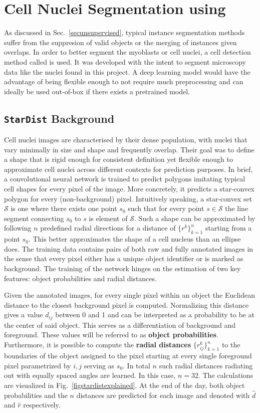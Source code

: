 \section{Cell Nuclei Segmentation using \stardist}\label{secstardist}
As discussed in Sec.~\ref{secunsupervised}, typical instance segmentation methods suffer from the suppresion of valid objects or the merging of instances given overlaps. In order to better segment the myoblasts or cell nuclei, a cell detection method called \stardist \cite{schmidt2018, weigert2020} is used. It was developed with the intent to segment microscopy data like the nuclei found in this project. A deep learning model would have the advantage of being flexible enough to not require much preprocessing and can ideally be used out-of-box if there exists a pretrained model.
\subsection{\texttt{StarDist} Background}
Cell nuclei images are characterised by their dense population, with nuclei that vary minimally in size and shape and frequently overlap. Their goal was to define a shape that is rigid enough for consistent definition yet flexible enough to approximate cell nuclei across different contexts for prediction purposes. In brief, a convolutional neural network is trained to predict polygons imitating typical cell shapes for every pixel of the image. More concretely, it predicts a star-convex polygon for every (non-background) pixel. Intuitively speaking, a star-convex set $\mathcal{S}$ is one where there exists one point $s_{0}$ such that for every point $s \in \mathcal{S}$ the line segment connecting $s_{0}$ to $s$ is element of $\mathcal{S}$. Such a shape can be approximated by following $n$ predefined radial directions for a distance of $\{r^{k}\}^{n}_{k = 1}$ starting from a point $s_{0}$. This better approximates the shape of a cell nucleus than an ellipse does. The training data contains pairs of both raw and fully annotated images in the sense that every pixel either has a unique object identifier or is marked as background. The training of the network hinges on the estimation of two key features: object probabilities and radial distances.

Given the annotated images, for every single pixel within an object the Euclidean distance to the closest background pixel is computed. Normalizing this distance gives a value $d_{ij}$ between 0 and 1 and can be interpreted as a probability to be at the center of said object. This serves as a differentiation of background and foreground. These values will be referred to as \textbf{object probabilities}. Furthermore, it is possible to compute the \textbf{radial distances} $\{r^{k}_{ij}\}^{n}_{k = 1}$ to the boundaries of the object assigned to the pixel  starting at every single foreground pixel parametrized by $i, j$ serving as $s_{0}$. In total $n$ such radial distances radiating out with equally spaced angles are learned. In this case, $n = 32$. The calculations are visualized in Fig.~\ref{figstardistexplained}. At the end of the day, both object probabilities and the $n$ distances are predicted for each image and denoted with $\hat{d}$ and $\hat{r}$ respectively. 


